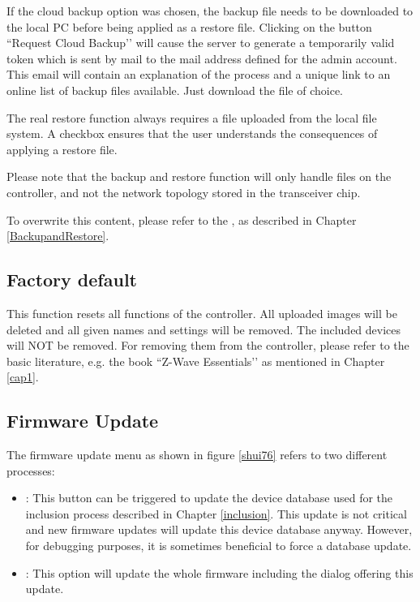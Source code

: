 If the cloud backup option was chosen, the backup file needs to be downloaded to the 
local PC before being applied as a restore file. Clicking on the button ``Request Cloud Backup’’ 
will cause the server to generate a temporarily valid token which is sent by mail to the 
mail address defined for the admin account. This email will contain an explanation of the 
process and a unique link to an online list of backup files available. Just download the file of choice.

The real restore function always requires a file uploaded from the local file system. A 
checkbox ensures that the user understands the consequences of applying a restore file.

Please note that the backup and restore function will only handle files on the controller, 
and not the \zwave network topology stored in the \zwave transceiver chip.

To overwrite this content, please refer to the \zweui, as 
described in Chapter \ref{BackupandRestore}.


\subsection{Factory default}

This function resets all functions of the controller. All uploaded images will be deleted 
and all given names and settings will be removed. The included \zwave devices will NOT be 
removed. For removing them from the controller, please refer to the basic \zwave 
literature, e.g. the book ``Z-Wave Essentials’’ as mentioned in Chapter \ref{cap1}.


\subsection{Firmware Update}

The firmware update menu as shown in figure \ref{shui76} refers to two different processes:

\begin{itemize}
\item {}: This button can be triggered to update the \zwave device 
database used for the inclusion process described in Chapter \ref{inclusion}. This 
update is not critical and new firmware updates will update this device database 
anyway. However, for debugging purposes, it is sometimes beneficial to force a database update.
\item {}: This option will update the whole firmware including the dialog 
offering this update.
\end{itemize}

